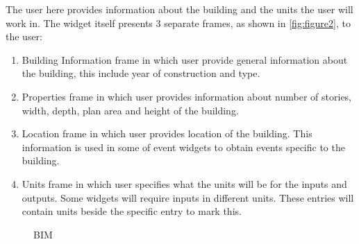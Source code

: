The user here provides information about the building and the units the user will work in. The widget itself presents 3 separate frames, as shown in \autoref{fig:figure2}, to the user:

\begin{enumerate}
\item Building Information frame in which user provide general information about the building, this include year of construction and type.
\item Properties frame in which user provides information about number of stories, width, depth, plan area and height of the building.
\item Location frame in which user provides location of the building. This information is used in some of event widgets to obtain events specific to the building.
\item Units frame  in which user specifies what the units will be for the inputs and outputs. Some widgets will require inputs in different units. These entries will contain units beside the specific entry to mark this.
\end{enumerate}


\begin{figure}[!htbp]
  \caption{BIM}
  \label{fig:figure2}
\end{figure}

